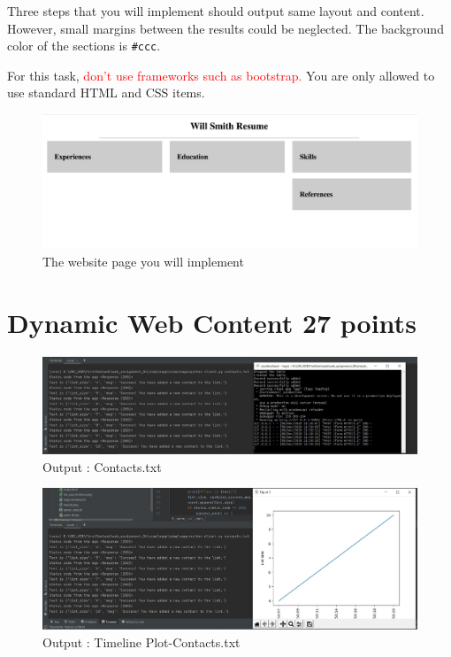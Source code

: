 \documentclass{resources/WeSTassignment}
\begin{document}
Three steps that you will implement should output same layout and content. However, small margins between the results could be neglected. The background color of the sections is \texttt{\#ccc}.

For this task, \textcolor{red}{don't use frameworks such as bootstrap.} You are only allowed to use standard HTML and CSS items. 

\begin{figure}[ht]
    \centering
    \includegraphics[scale=0.4]{html.png}
    \caption{The website page you will implement}
    \label{fig:my_label}
\end{figure}

\section{Dynamic Web Content \hfill{27 points}}

	   \begin{figure}[ht]
    			\centering
    			\includegraphics[scale=0.4]{resources/finalContactsServer.JPG}
    			\caption{Output : Contacts.txt}
    			\label{fig:contacts.txt}
\end{figure}

		\begin{figure}[ht]
    			\centering
    			\includegraphics[scale=0.4]{resources/finalContactstimeline.JPG}
    			\caption{Output : Timeline Plot-Contacts.txt}
    			\label{fig:Timeline Plot Contacts.txt}
\end{figure}
\end{document}
